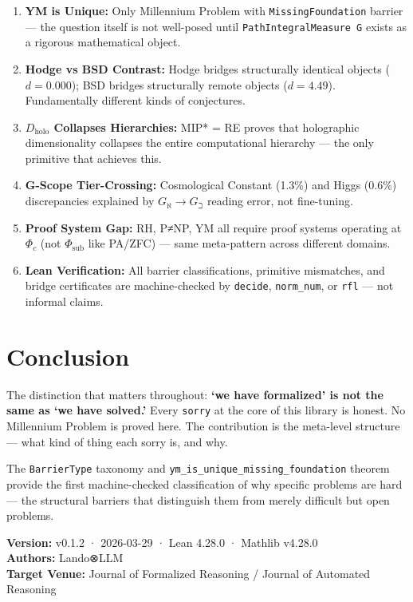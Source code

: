 \documentclass[11pt,a4paper]{article}
\begin{document}
\begin{enumerate}
    \item \textbf{YM is Unique:} Only Millennium Problem with \texttt{MissingFoundation} barrier — the question itself is not well-posed until \texttt{PathIntegralMeasure G} exists as a rigorous mathematical object.
    
    \item \textbf{Hodge vs BSD Contrast:} Hodge bridges structurally identical objects ($d{=}0.000$); BSD bridges structurally remote objects ($d{=}4.49$). Fundamentally different kinds of conjectures.
    
    \item \textbf{$D_{\text{holo}}$ Collapses Hierarchies:} MIP* = RE proves that holographic dimensionality collapses the entire computational hierarchy — the only primitive that achieves this.
    
    \item \textbf{G-Scope Tier-Crossing:} Cosmological Constant (1.3\%) and Higgs (0.6\%) discrepancies explained by $G_{\aleph} \to G_{\beth}$ reading error, not fine-tuning.
    
    \item \textbf{Proof System Gap:} RH, P≠NP, YM all require proof systems operating at $\Phi_c$ (not $\Phi_{\text{sub}}$ like PA/ZFC) — same meta-pattern across different domains.
    
    \item \textbf{Lean Verification:} All barrier classifications, primitive mismatches, and bridge certificates are machine-checked by \texttt{decide}, \texttt{norm\_num}, or \texttt{rfl} — not informal claims.
\end{enumerate}

\section{Conclusion}

\noindent The distinction that matters throughout: \textbf{`we have formalized' is not the same as `we have solved.'} Every \texttt{sorry} at the core of this library is honest. No Millennium Problem is proved here. The contribution is the meta-level structure — what kind of thing each sorry is, and why.

\vspace{1em}
\noindent The \texttt{BarrierType} taxonomy and \texttt{ym\_is\_unique\_missing\_foundation} theorem provide the first machine-checked classification of why specific problems are hard — the structural barriers that distinguish them from merely difficult but open problems.

\vspace{2em}
\noindent \textbf{Version:} v0.1.2 · 2026-03-29 · Lean 4.28.0 · Mathlib v4.28.0 \\
\textbf{Authors:} Lando⊗LLM \\
\textbf{Target Venue:} Journal of Formalized Reasoning / Journal of Automated Reasoning
\end{document}
